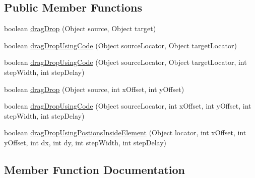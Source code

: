 \subsection*{Public Member Functions}
\begin{DoxyCompactItemize}
\item 
boolean \hyperlink{interfacecom_1_1zeuslearning_1_1automation_1_1interactions_1_1IDragDropOperations_ad506f9b5c61783b1fa43fbaea26e3508}{drag\+Drop} (Object source, Object target)
\item 
boolean \hyperlink{interfacecom_1_1zeuslearning_1_1automation_1_1interactions_1_1IDragDropOperations_afed1b914e214a57c5479d9f34f638f24}{drag\+Drop\+Using\+Code} (Object source\+Locator, Object target\+Locator)
\item 
boolean \hyperlink{interfacecom_1_1zeuslearning_1_1automation_1_1interactions_1_1IDragDropOperations_add2bbf31790e9254ef56f273cb73d707}{drag\+Drop\+Using\+Code} (Object source\+Locator, Object target\+Locator, int step\+Width, int step\+Delay)
\item 
boolean \hyperlink{interfacecom_1_1zeuslearning_1_1automation_1_1interactions_1_1IDragDropOperations_aab663e7a80d41c763bbd89b2c98011eb}{drag\+Drop} (Object source, int x\+Offset, int y\+Offset)
\item 
boolean \hyperlink{interfacecom_1_1zeuslearning_1_1automation_1_1interactions_1_1IDragDropOperations_a22f9d8dbaed0e998a2106f7ac0a42d6c}{drag\+Drop\+Using\+Code} (Object source\+Locator, int x\+Offset, int y\+Offset, int step\+Width, int step\+Delay)
\item 
boolean \hyperlink{interfacecom_1_1zeuslearning_1_1automation_1_1interactions_1_1IDragDropOperations_a3c7c7080c37207665eb6b2a760847a35}{drag\+Drop\+Using\+Postions\+Inside\+Element} (Object locator, int x\+Offset, int y\+Offset, int dx, int dy, int step\+Width, int step\+Delay)
\end{DoxyCompactItemize}


\subsection{Member Function Documentation}
\hypertarget{interfacecom_1_1zeuslearning_1_1automation_1_1interactions_1_1IDragDropOperations_ad506f9b5c61783b1fa43fbaea26e3508}{}\label{interfacecom_1_1zeuslearning_1_1automation_1_1interactions_1_1IDragDropOperations_ad506f9b5c61783b1fa43fbaea26e3508} 
